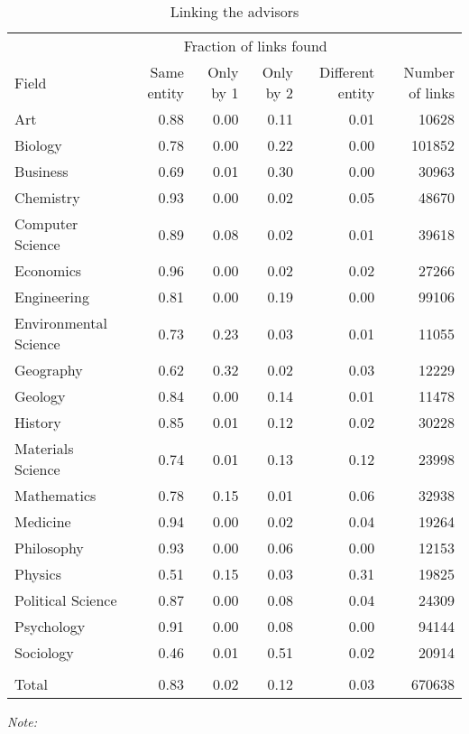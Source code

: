 \begin{table}
\centering
\caption{\label{tab:compare_linking_advisors}Linking the advisors}
\centering
\fontsize{9}{11}\selectfont
\begin{threeparttable}
\begin{tabular}[t]{lrrrrr}
\toprule
\multicolumn{1}{c}{ } & \multicolumn{4}{c}{Fraction of links found} & \multicolumn{1}{c}{ } \\
Field & Same entity & Only by 1 & Only by 2 & Different entity & Number of links\\
\midrule
Art & 0.88 & 0.00 & 0.11 & 0.01 & 10628\\
Biology & 0.78 & 0.00 & 0.22 & 0.00 & 101852\\
Business & 0.69 & 0.01 & 0.30 & 0.00 & 30963\\
Chemistry & 0.93 & 0.00 & 0.02 & 0.05 & 48670\\
Computer Science & 0.89 & 0.08 & 0.02 & 0.01 & 39618\\
\addlinespace
Economics & 0.96 & 0.00 & 0.02 & 0.02 & 27266\\
Engineering & 0.81 & 0.00 & 0.19 & 0.00 & 99106\\
Environmental Science & 0.73 & 0.23 & 0.03 & 0.01 & 11055\\
Geography & 0.62 & 0.32 & 0.02 & 0.03 & 12229\\
Geology & 0.84 & 0.00 & 0.14 & 0.01 & 11478\\
\addlinespace
History & 0.85 & 0.01 & 0.12 & 0.02 & 30228\\
Materials Science & 0.74 & 0.01 & 0.13 & 0.12 & 23998\\
Mathematics & 0.78 & 0.15 & 0.01 & 0.06 & 32938\\
Medicine & 0.94 & 0.00 & 0.02 & 0.04 & 19264\\
Philosophy & 0.93 & 0.00 & 0.06 & 0.00 & 12153\\
\addlinespace
Physics & 0.51 & 0.15 & 0.03 & 0.31 & 19825\\
Political Science & 0.87 & 0.00 & 0.08 & 0.04 & 24309\\
Psychology & 0.91 & 0.00 & 0.08 & 0.00 & 94144\\
Sociology & 0.46 & 0.01 & 0.51 & 0.02 & 20914\\
\midrule\\
Total & 0.83 & 0.02 & 0.12 & 0.03 & 670638\\
\bottomrule
\end{tabular}
\begin{tablenotes}[para]
\small
\item \textit{Note: } 

\end{tablenotes}
\end{threeparttable}
\end{table}
